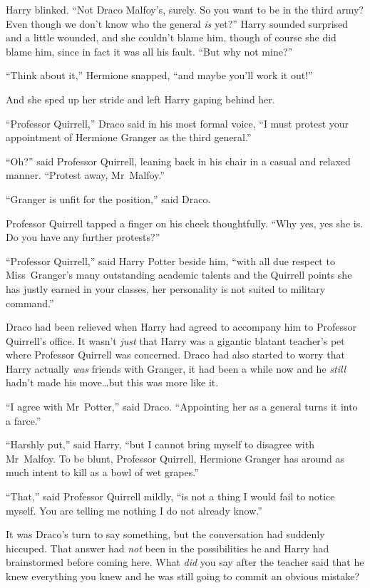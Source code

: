 Harry blinked. “Not Draco Malfoy’s, surely. So you want to be in the third army? Even though we don’t know who the general \emph{is} yet?” Harry sounded surprised and a little wounded, and she couldn’t blame him, though of course she did blame him, since in fact it was all his fault. “But why not mine?”

“Think about it,” Hermione snapped, “and maybe you’ll work it out!”

And she sped up her stride and left Harry gaping behind her.

\later

“Professor Quirrell,” Draco said in his most formal voice, “I must protest your appointment of Hermione Granger as the third general.”

“Oh?” said Professor Quirrell, leaning back in his chair in a casual and relaxed manner. “Protest away, Mr~Malfoy.”

“Granger is unfit for the position,” said Draco.

Professor Quirrell tapped a finger on his cheek thoughtfully. “Why yes, yes she is. Do you have any further protests?”

“Professor Quirrell,” said Harry Potter beside him, “with all due respect to Miss~Granger’s many outstanding academic talents and the Quirrell points she has justly earned in your classes, her personality is not suited to military command.”

Draco had been relieved when Harry had agreed to accompany him to Professor Quirrell’s office. It wasn’t \emph{just} that Harry was a gigantic blatant teacher’s pet where Professor Quirrell was concerned. Draco had also started to worry that Harry actually \emph{was} friends with Granger, it had been a while now and he \emph{still} hadn’t made his move…but this was more like it.

“I agree with Mr~Potter,” said Draco. “Appointing her as a general turns it into a farce.”

“Harshly put,” said Harry, “but I cannot bring myself to disagree with Mr~Malfoy. To be blunt, Professor Quirrell, Hermione Granger has around as much intent to kill as a bowl of wet grapes.”

“That,” said Professor Quirrell mildly, “is not a thing I would fail to notice myself. You are telling me nothing I do not already know.”

It was Draco’s turn to say something, but the conversation had suddenly hiccuped. That answer had \emph{not} been in the possibilities he and Harry had brainstormed before coming here. What \emph{did} you say after the teacher said that he knew everything you knew and he was still going to commit an obvious mistake?

